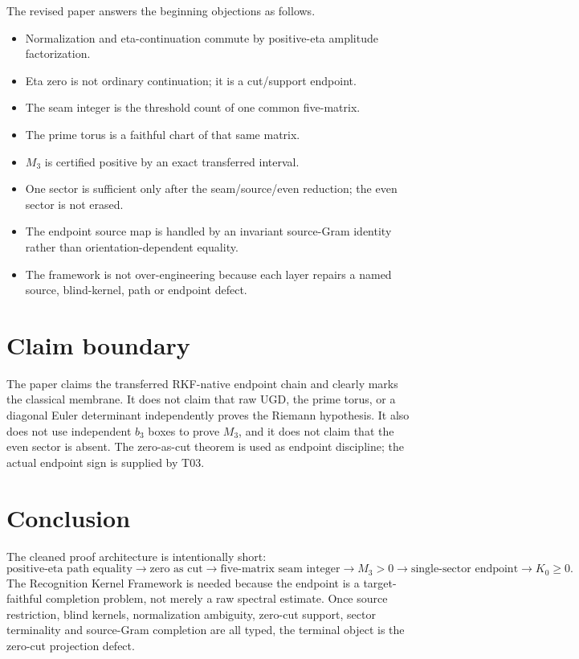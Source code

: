 \documentclass[11pt]{article}
\begin{document}
The revised paper answers the beginning objections as follows.
\begin{itemize}
\item Normalization and eta-continuation commute by positive-eta amplitude factorization.
\item Eta zero is not ordinary continuation; it is a cut/support endpoint.
\item The seam integer is the threshold count of one common five-matrix.
\item The prime torus is a faithful chart of that same matrix.
\item \(M_3\) is certified positive by an exact transferred interval.
\item One sector is sufficient only after the seam/source/even reduction; the even sector is not erased.
\item The endpoint source map is handled by an invariant source-Gram identity rather than orientation-dependent equality.
\item The framework is not over-engineering because each layer repairs a named source, blind-kernel, path or endpoint defect.
\end{itemize}

\section{Claim boundary}

The paper claims the transferred RKF-native endpoint chain and clearly marks the classical membrane.  It does not claim that raw UGD, the prime torus, or a diagonal Euler determinant independently proves the Riemann hypothesis.  It also does not use independent \(b_3\) boxes to prove \(M_3\), and it does not claim that the even sector is absent.  The zero-as-cut theorem is used as endpoint discipline; the actual endpoint sign is supplied by T03.

\section{Conclusion}

The cleaned proof architecture is intentionally short:
\[
\text{positive-eta path equality}
\to
\text{zero as cut}
\to
\text{five-matrix seam integer}
\to
M_3>0
\to
\text{single-sector endpoint}
\to
K_0\ge0.
\]
The Recognition Kernel Framework is needed because the endpoint is a target-faithful completion problem, not merely a raw spectral estimate.  Once source restriction, blind kernels, normalization ambiguity, zero-cut support, sector terminality and source-Gram completion are all typed, the terminal object is the zero-cut projection defect.
\end{document}
